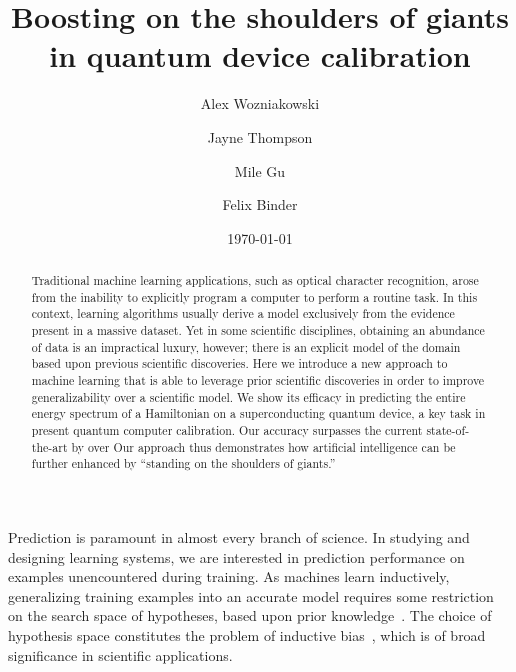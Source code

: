 \documentclass[aps,twocolumn,superscriptaddress,floatfix,preprintnumbers,showkeys]{revtex4}
\begin{document}
\title{Boosting on the shoulders of giants in quantum device calibration}

\author{Alex Wozniakowski}
\author{Jayne Thompson}
\author{Mile Gu}
\author{Felix Binder}


\date{\today}

\begin{abstract}
Traditional machine learning applications, such as optical character recognition, arose from the inability to explicitly program a computer to perform a routine task. In this context, learning algorithms usually derive a model exclusively from the evidence present in a massive dataset. Yet in some scientific disciplines, obtaining an abundance of data is an impractical luxury, however; there is an explicit model of the domain based upon previous scientific discoveries. Here we introduce a new approach to machine learning that is able to leverage prior scientific discoveries in order to improve generalizability over a scientific model. We show its efficacy in predicting the entire energy spectrum of a Hamiltonian on a superconducting quantum device, a key task in present quantum computer calibration. Our accuracy surpasses the current state-of-the-art by over  Our approach thus demonstrates how artificial intelligence can be further enhanced by ``standing on the shoulders of giants.''
\end{abstract}

\maketitle

Prediction is paramount in almost every branch of science. In studying and designing learning systems, we are interested in prediction performance on examples unencountered during training. As machines learn inductively, generalizing training examples into an accurate model requires some restriction on the search space of hypotheses, based upon prior knowledge~\cite{Hume_1739,Haussler_1988, Mitchell_1991, Wolpert_1997}. The choice of hypothesis space constitutes the problem of inductive bias~\cite{Haussler_1988, Mitchell_1991, Caruana_1997, Wolpert_1997, Baxter_2000}, which is of broad significance in scientific applications.
\end{document}
